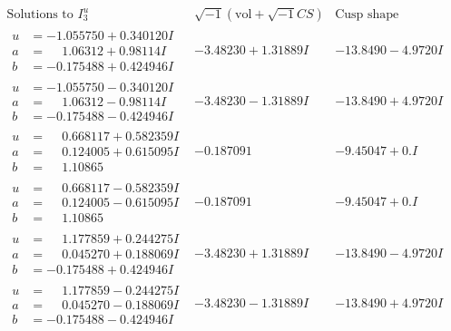 \documentclass[1p]{elsarticle_modified}
\theoremstyle{definition}
\newcommand{\I}{\sqrt{-1}}
\begin{document}
$$\begin{array}{c|c|c}  
\text{Solutions to }I^u_{3}& \I (\text{vol} + \sqrt{-1}CS) & \text{Cusp shape}\\
 \hline 
\begin{aligned}
u &= -1.055750 + 0.340120 I \\
a &= \phantom{-}1.06312 + 0.98114 I \\
b &= -0.175488 + 0.424946 I\end{aligned}
 & -3.48230 + 1.31889 I & -13.8490 - 4.9720 I \\ \hline\begin{aligned}
u &= -1.055750 - 0.340120 I \\
a &= \phantom{-}1.06312 - 0.98114 I \\
b &= -0.175488 - 0.424946 I\end{aligned}
 & -3.48230 - 1.31889 I & -13.8490 + 4.9720 I \\ \hline\begin{aligned}
u &= \phantom{-}0.668117 + 0.582359 I \\
a &= \phantom{-}0.124005 + 0.615095 I \\
b &= \phantom{-}1.10865\phantom{ +0.000000I}\end{aligned}
 & -0.187091\phantom{ +0.000000I} & -9.45047 + 0. I\phantom{ +0.000000I} \\ \hline\begin{aligned}
u &= \phantom{-}0.668117 - 0.582359 I \\
a &= \phantom{-}0.124005 - 0.615095 I \\
b &= \phantom{-}1.10865\phantom{ +0.000000I}\end{aligned}
 & -0.187091\phantom{ +0.000000I} & -9.45047 + 0. I\phantom{ +0.000000I} \\ \hline\begin{aligned}
u &= \phantom{-}1.177859 + 0.244275 I \\
a &= \phantom{-}0.045270 + 0.188069 I \\
b &= -0.175488 + 0.424946 I\end{aligned}
 & -3.48230 + 1.31889 I & -13.8490 - 4.9720 I \\ \hline\begin{aligned}
u &= \phantom{-}1.177859 - 0.244275 I \\
a &= \phantom{-}0.045270 - 0.188069 I \\
b &= -0.175488 - 0.424946 I\end{aligned}
 & -3.48230 - 1.31889 I & -13.8490 + 4.9720 I \\ \hline\begin{aligned}

\end{aligned}
\end{array}$$
\end{document}
